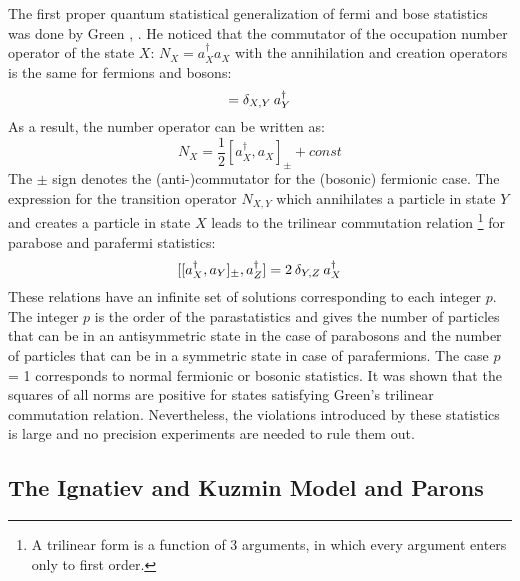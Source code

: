The first proper quantum statistical generalization of fermi and bose statistics was done by Green \cite{Green1953}, \cite{Greenberg2000}. He noticed that the commutator of the occupation number operator of the state $X$: $N_{X} = a^{\dag}_{X} a_{X} $ with the annihilation and creation operators is the same for fermions and bosons:
\begin{equation}
 [N_{X},a^{\dag}_{Y}] = \delta_{X,Y} \hspace{0.2em} a^{\dag}_{Y}
\end{equation} 
As a result, the number operator can be written as:
\begin{equation}
 N_{X} = \frac{1}{2}[a^{\dag}_{X},a_{X}]_{\pm} + const
\end{equation} 
The $\pm$ sign denotes the (anti-)commutator for the (bosonic) fermionic case. The expression for the transition operator $N_{X,Y}$ which annihilates a particle in state $Y$ and creates a particle in state $X$ leads to the trilinear commutation relation \footnote{A trilinear form is a function of 3 arguments, in which every argument enters only to first order.} for parabose and parafermi statistics:
\begin{equation}
\label{eq:triComm}
 [[a^{\dag}_{X},a_{Y}]_{\pm},a_{Z}^{\dag}] = 2 \hspace{0.2em} \delta_{Y,Z} \hspace{0.2em} a_{X}^{\dag}
\end{equation} 
These relations have an infinite set of solutions corresponding to each integer $p$. The integer $p$ is the order of the parastatistics and gives the number of particles that can be in an antisymmetric state in the case of parabosons and the number of particles that can be in a symmetric state in case of parafermions. The case $p$ = 1 corresponds to normal fermionic or bosonic statistics. It was shown that the squares of all norms are positive for states satisfying Green's trilinear commutation relation. Nevertheless, the violations introduced by these statistics is large and no precision experiments are needed to rule them out.

\subsection{The Ignatiev and Kuzmin Model and Parons}

